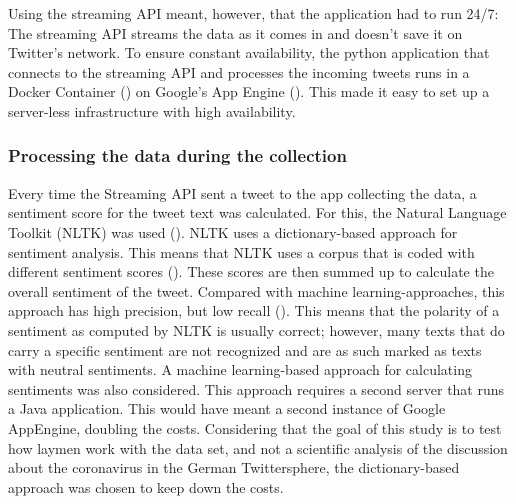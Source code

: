 Using the streaming API meant, however, that the application had to run 24/7: The streaming API streams the data as it comes in and doesn't save it on Twitter's network. To ensure constant availability, the python application that connects to the streaming API and processes the incoming tweets runs in a Docker Container (\cite{merkel2014docker}) on Google's App Engine (\cite{google2020}). This made it easy to set up a server-less infrastructure with high availability.

\subsubsection{Processing the data during the collection}
Every time the Streaming API sent a tweet to the app collecting the data, a sentiment score for the tweet text was calculated. For this, the Natural Language Toolkit (NLTK) was used (\cite{loper2002nltk}). NLTK uses a dictionary-based approach for sentiment analysis. This means that NLTK uses a corpus that is coded with different sentiment scores (\cite{haselmayer2017sentiment}). These scores are then summed up to calculate the overall sentiment of the tweet.
Compared with machine learning-approaches, this approach has high precision, but low recall (\cite{soroka2015}). This means that the polarity of a sentiment as computed by NLTK is usually correct; however, many texts that do carry a specific sentiment are not recognized and are as such marked as texts with neutral sentiments.
A machine learning-based approach for calculating sentiments was also considered. This approach requires a second server that runs a Java application. This would have meant a second instance of Google AppEngine, doubling the costs. Considering that the goal of this study is to test how laymen work with the data set, and not a scientific analysis of the discussion about the coronavirus in the German Twittersphere, the dictionary-based approach was chosen to keep down the costs.

